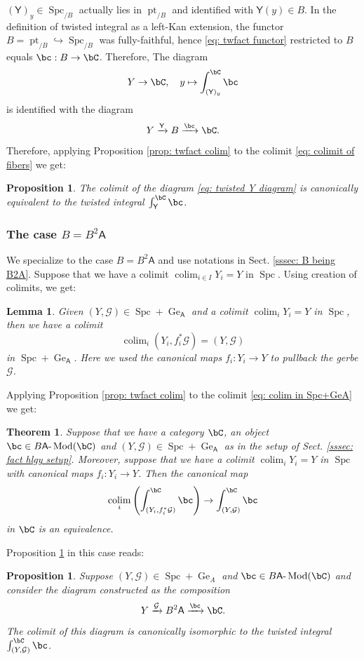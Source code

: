 \documentclass[10pt]{amsart}
\newcommand{\sssec}{\subsubsection}
\newtheorem{thm}[subsubsection]{Theorem}
\newtheorem{lemma}[subsubsection]{Lemma}
\newtheorem{prop}[subsubsection]{Proposition}
\theoremstyle{remark}
\newcommand{\mc}[1]{\mathcal{#1}}
\newcommand{\on}{\operatorname}
\newcommand{\cG}{\mathcal{G}}
\newcommand{\lMod}{\text{-}\on{Mod}}
\newcommand{\Spc}{\on{Spc}}
\DeclareMathOperator{\colim}{colim}
\newcommand{\pt}{\on{pt}}
\newcommand{\sfA}{\mathsf{A}}
\newcommand{\sfY}{\mathsf{Y}}
\begin{document}
  $(\sfY)_y\in \Spc_{/B}$ actually lies in $\pt_{/B}$ and identified with $\sfY(y)\in B$. In the definition of twisted integral as a left-Kan extension, the functor $B=\pt_{/B}\hookrightarrow \Spc_{/B}$ was fully-faithful, hence \eqref{eq: twfact functor} restricted to $B$ equals $\bc:B\rightarrow \bC$. Therefore,
 The diagram
 \[Y\rightarrow \bC,\quad y\mapsto \int^{\bC}_{(\sfY)_y}\bc\]
 is identified with the diagram
\begin{equation}\label{eq: twisted Y diagram}
    Y\xrightarrow{\sfY}B\xrightarrow{\bc}\bC.
\end{equation}
 Therefore, applying Proposition \ref{prop: twfact colim} to the colimit \eqref{eq: colimit of fibers} we get:
\begin{prop}\label{prop: twisted Y diagram for general B}
    The colimit of the diagram \eqref{eq: twisted Y diagram} is canonically equivalent to the twisted integral $\int^{\bC}_{\sfY}\bc$.
\end{prop}

\sssec{The case $B=B^2\sfA$}
We specialize to the case $B=B^2\sfA$ and use notations in Sect. \ref{sssec: B being B2A}. Suppose that we have a colimit $\colim_{i\in I}Y_i=Y$ in $\Spc$. Using creation of colimits, we get:
\begin{lemma}\label{lem: colim in LKE+GeA}
    Given $(Y,\mc{G})\in\Spc+\on{Ge}_{\sfA}$ and a colimit $\colim_i Y_i =Y$ in $\Spc$, then we have a colimit
    \begin{equation}\label{eq: colim in Spc+GeA}
        \colim_i (Y_i, f^*_i \mc{G})=(Y,\mc{G})
    \end{equation}
in $\Spc+\on{Ge}_{\sfA}$. Here we used the canonical maps $f_i: Y_i\rightarrow Y$ to pullback the gerbe $\mc{G}$.
\end{lemma}

Applying Proposition \ref{prop: twfact colim} to the colimit \eqref{eq: colim in Spc+GeA} we get:
\begin{thm}\label{thm: fact hlgy and colimit}
    Suppose that we have a category $\bC$, an object $\bc\in B\sfA\lMod(\bC)$ and $(Y,\mc{G})\in\Spc+\on{Ge}_{\sfA}$ as in the setup of Sect. \ref{sssec: fact hlgy setup}. Moreover, suppose that we have a colimit $\colim_i Y_i =Y$ in $\Spc$ with canonical maps $f_i: Y_i\rightarrow Y$. Then the canonical map
    \[\colim_i \left(\int^{\bC}_{(Y_i,f^*_i \mc{G})} \bc\right) \rightarrow \int^{\bC}_{(Y,\mc{G})} \bc\]
    in $\bC$ is an equivalence.
\end{thm}

Proposition \ref{prop: twisted Y diagram for general B} in this case reads:
\begin{prop}\label{prop: twisted Y diagram}
    Suppose $(Y,\cG)\in\Spc+\on{Ge}_A$ and $\bc\in B\sfA\lMod(\bC)$ and consider the diagram constructed as the composition
    \begin{equation}\label{eq: twisted Y diagram for B}
        Y\xrightarrow{\mc{G}}B^2 \sfA\xrightarrow{\bc}\bC.
    \end{equation}
    The colimit of this diagram is canonically isomorphic to the twisted integral
    $\int^{\bC}_{(Y,\mc{G})}\bc$.
\end{prop}
\end{document}
